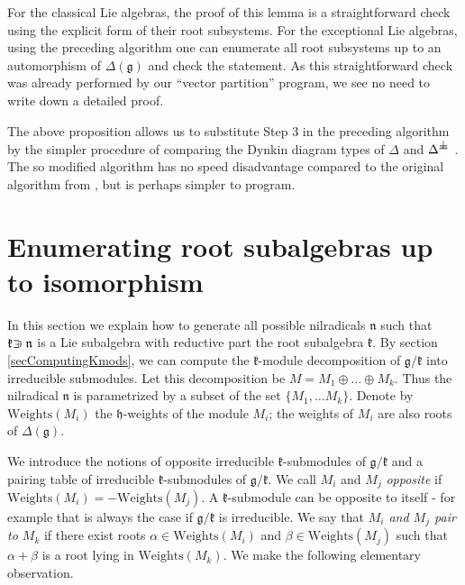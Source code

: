 \documentclass[12pt]{report}
\newcommand{\kk}{\mathfrak{k}}
\newcommand{\nn}{\mathfrak{n}}
\newcommand{\hh}{\mathfrak{h}}
\newcommand{\gG}{\mathfrak{g}}
\newcommand{\sL}{\mathrm{sl}}
\newcommand{\weights}{\mathrm{Weights}}
\def\crplus{\hbox{$\supset${\raise1.05pt\hbox{\kern -0.60em ${\scriptscriptstyle +}$}}\ }}
\def\sperp{{\hbox{$\perp${\hbox{\kern -.77em $-$}\raise-1pt\hbox{\kern -.77em $-$}}\ }}}
\begin{document}
For the classical Lie algebras, the proof of this lemma is a straightforward check using the explicit form of their root subsystems. For the exceptional Lie algebras, using the preceding algorithm one can enumerate all root subsystems up to an automorphism of $\Delta(\gG)$ and check the statement. As this straightforward check was already performed by our ``vector partition'' program, we see no need to write down a detailed proof.

The above proposition allows us to substitute Step 3 in the preceding algorithm by the simpler procedure of comparing the Dynkin diagram types of $\Delta$ and $\Delta^\sperp$. The so modified algorithm has no speed disadvantage compared to the original algorithm from \cite{Dynkin:Semisimple}, but is perhaps simpler to program.



\section{Enumerating root subalgebras up to isomorphism}\label{secEnumeratingRootSAs}
In this section we explain how to generate all possible nilradicals $\nn$ such that $\kk\crplus \nn$ is a Lie subalgebra with reductive part the root subalgebra $\kk$. By section \ref{secComputingKmods}, we can compute the $\kk$-module decomposition of $\gG/\kk$ into irreducible submodules. Let this decomposition be $M=M_1\oplus \dots\oplus M_k$. Thus the nilradical $\nn$ is parametrized by a subset of the set $\{M_1,\dots M_k\}$. Denote by $\weights(M_i)$ the $\hh$-weights of the module $M_i$; the weights of $M_i$ are also roots of $\Delta(\gG)$.

We introduce the notions of opposite irreducible $\kk$-submodules of $\gG/\kk$ and a pairing table of irreducible $\kk$-submodules of $\gG/\kk$.  We call $M_i$ and $M_j$ \emph{opposite} if $\weights(M_i)=-\weights(M_j)$. A $\kk$-submodule can be opposite to itself - for example  that is always the case if $\gG/\kk$ is irreducible. %
We say that \emph{$M_i$ and $M_j$ pair to $M_k$} if there exist roots $\alpha\in \weights (M_i)$ and $\beta\in\weights (M_j)$ such that $\alpha+\beta$ is a root lying in $\weights (M_k)$. We make the following elementary observation.
\end{document}
